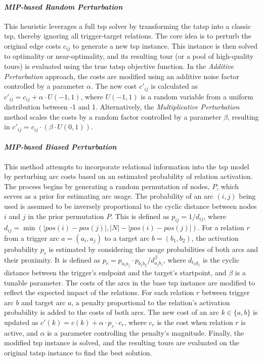 \documentclass[twocolumn, switch]{article} %
\begin{document}
\paragraph{\textit{MIP-based Random Perturbation}}
This heuristic leverages a full \gls{tsp} solver by transforming the \gls{tatsp} into a classic \gls{tsp}, thereby ignoring all trigger-target relations.
The core idea is to perturb the original edge costs $c_{ij}$ to generate a new \gls{tsp} instance.
This instance is then solved to optimality or near-optimality, and its resulting tour (or a pool of high-quality tours) is evaluated using the true \gls{tatsp} objective function.
In the \textit{Additive Perturbation} approach, the costs are modified using an additive noise factor controlled by a parameter $\alpha$. The new cost $c'_{ij}$ is calculated as $c'_{ij} = c_{ij} + \alpha \cdot U(-1, 1)$, where $U(-1, 1)$ is a random variable from a uniform distribution between -1 and 1. Alternatively, the \textit{Multiplicative Perturbation} method scales the costs by a random factor controlled by a parameter $\beta$, resulting in $c'_{ij} = c_{ij} \cdot (\beta \cdot U(0, 1))$.
  
\paragraph{\textit{MIP-based Biased Perturbation}}
This method attempts to incorporate relational information into the \gls{tsp} model by perturbing arc costs based on an estimated probability of relation activation. The process begins by generating a random permutation of nodes, $P$, which serves as a prior for estimating arc usage. The probability of an arc $(i, j)$ being used is assumed to be inversely proportional to the cyclic distance between nodes $i$ and $j$ in the prior permutation $P$. This is defined as $p_{ij} = 1/d_{ij}$, where $d_{ij} = \min(|pos(i)-pos(j)|, |N| - |pos(i)-pos(j)|)$. For a relation $r$ from a trigger arc $a=(a_i, a_j)$ to a target arc $b=(b_1, b_2)$, the activation probability $p_r$ is estimated by considering the usage probabilities of both arcs and their proximity. It is defined as $p_r = p_{a_ia_j} \cdot p_{b_1b_2} / d_{a_jb_1}^\beta$, where $d_{t_2g_1}$ is the cyclic distance between the trigger's endpoint and the target's startpoint, and $\beta$ is a tunable parameter. The costs of the arcs in the base \gls{tsp} instance are modified to reflect the expected impact of the relations. For each relation $r$ between trigger arc $b$ and target arc $a$, a penalty proportional to the relation's activation probability is added to the costs of both arcs. The new cost of an arc $k \in \{a,b\}$ is updated as $c'(k) = c(k) + \alpha \cdot p_r \cdot c_r$, where $c_r$ is the cost when relation $r$ is active, and $\alpha$ is a parameter controlling the penalty's magnitude. Finally, the modified \gls{tsp} instance is solved, and the resulting tours are evaluated on the original \gls{tatsp} instance to find the best solution.
\end{document}
